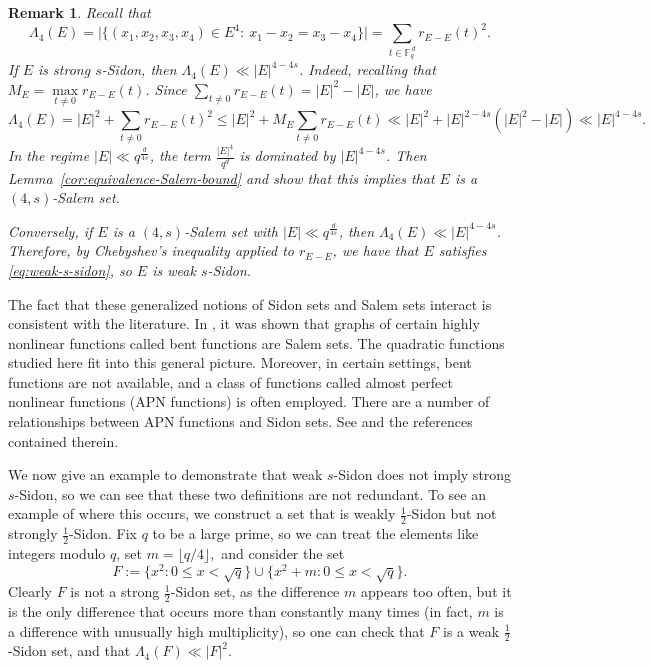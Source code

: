 \documentclass{article}
\newtheorem{remark}{Remark}[section]
\def\dung#1{\noindent
\textcolor{magenta}
{\textsc{(Dung:}
\textsf{#1})}}
\begin{document}
\begin{remark}\label{rem:s-sidon-salem}
Recall that
\[
\Lambda_4(E)
=
\bigl|\{(x_1,x_2,x_3,x_4)\in E^4:\ x_1-x_2=x_3-x_4\}\bigr|
=
\sum_{t\in \mathbb{F}_q^{\,d}} r_{E-E}(t)^2.
\]
If $E$ is strong $s$-Sidon, then $\Lambda_4(E)\ll |E|^{4-4s}$.
Indeed, recalling that $M_E=\max\limits_{t\ne 0} r_{E-E}(t)$.
Since $\sum\limits_{t\ne 0} r_{E-E}(t)=|E|^2-|E|$, we have
\[
\Lambda_4(E)
=
|E|^2+\sum_{t\ne 0} r_{E-E}(t)^2
\le
|E|^2+M_E\sum_{t\ne 0} r_{E-E}(t)
\ll
|E|^2+|E|^{2-4s}(|E|^2-|E|)
\ll
|E|^{4-4s}.
\]
In the regime $|E|\ll q^{\frac{d}{4s}}$, the term $ \frac{|E|^4}{q^d}$ is dominated by $|E|^{4-4s}$.
Then Lemma~\ref{cor:equivalence-Salem-bound} and \cite[Remark~16]{CGKPTZ25} show that this implies that $E$ is a $(4,s)$-Salem set.

Conversely, if $E$ is a $(4,s)$-Salem set with $|E|\ll q^{\frac{d}{4s}}$, then $\Lambda_4(E)\ll |E|^{4-4s}$.
Therefore, by Chebyshev's inequality applied to $r_{E-E}$, we have that $E$ satisfies \eqref{eq:weak-s-sidon}, so %
$E$ is weak $s$-Sidon.
\end{remark}

The fact that these generalized notions of Sidon sets and Salem sets interact is consistent with the literature. In \cite{CS25}, it was shown that graphs of certain highly nonlinear functions called bent functions are Salem sets. The quadratic functions studied here fit into this general picture. Moreover, in certain settings, bent functions are not available, and a class of functions called almost perfect nonlinear functions (APN functions) is often employed. There are a number of relationships between APN functions and Sidon sets. See \cite{MT25} and the references contained therein.

We now give an example to demonstrate that weak $s$-Sidon does not imply strong $s$-Sidon, so we can see that these two definitions are not redundant. To see an example of where this occurs, we construct a set that is weakly $\frac{1}{2}$-Sidon but not strongly $\frac{1}{2}$-Sidon. Fix $q$ to be a large prime, so we can treat the elements like integers modulo $q$, set $m=\lfloor q/4 \rfloor,$ and consider the set
\[F:=\{x^2:0\leq x< \sqrt q\}\cup \{x^2+m:0\leq x< \sqrt q\}.\]
Clearly $F$ is not a strong $\frac{1}{2}$-Sidon set, as the difference $m$ appears too often, but it is the only difference that occurs more than constantly many times (in fact, $m$ is a difference with unusually high multiplicity), so one can check that $F$ is a weak $\frac{1}{2}$-Sidon set, and that $\Lambda_4(F)\ll |F|^2$.
\end{document}
